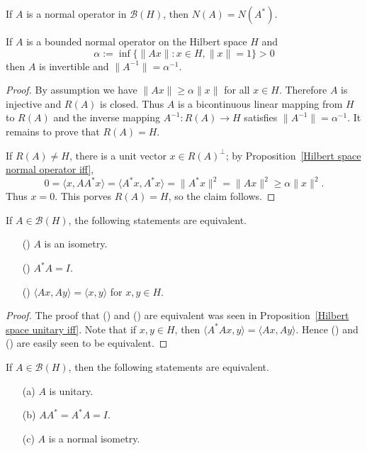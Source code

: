 \begin{corollary}
If $A$ is a normal operator in $\mathcal{B}(H)$, then $N(A)=N(A^*)$.
\end{corollary}
\begin{proposition}\label{Hilbert space normal operator invertible iff}
If $A$ is a bounded normal operator on the Hilbert space $H$ and
\[\alpha:=\inf\{\|Ax\|:x\in H,\|x\|=1\}>0\]
then $A$ is invertible and $\|A^{-1}\|=\alpha^{-1}$.
\end{proposition}
\begin{proof}
By assumption we have $\|Ax\|\geq\alpha\|x\|$ for all $x\in H$. Therefore  $A$ is injective and $R(A)$ is closed. Thus $A$ is a bicontinuous linear mapping from $H$ to $R(A)$ and the inverse mapping $A^{-1}:R(A)\to H$ satisfies $\|A^{-1}\|=\alpha^{-1}$. It remains to prove that $R(A)=H$.\par
If $R(A)\neq H$, there is a unit vector $x\in R(A)^\bot$; by Proposition~\ref{Hilbert space normal operator iff},
\[0=\langle x,AA^*x\rangle=\langle A^*x,A^*x\rangle=\|A^*x\|^2=\|Ax\|^2\geq\alpha\|x\|^2.\]
Thus $x=0$. This porves $R(A)=H$, so the claim follows.
\end{proof}
\begin{proposition}\label{Hilbert space isometry iff}
If $A\in\mathcal{B}(H)$, the following statements are equivalent.
\begin{itemize}
\item[(\rmnum{1})] $A$ is an isometry.
\item[(\rmnum{2})] $A^*A=I$.
\item[(\rmnum{3})] $\langle Ax,Ay\rangle=\langle x,y\rangle$ for $x,y\in H$.
\end{itemize}
\end{proposition}
\begin{proof}
The proof that () and () are equivalent was seen in Proposition~\ref{Hilbert space unitary iff}. Note that if $x,y\in H$, then $\langle A^*Ax,y\rangle=\langle Ax,Ay\rangle$. Hence () and () are easily seen to be equivalent.
\end{proof}
\begin{proposition}\label{Hilbert space unitary iff normal isometry}
If $A\in\mathcal{B}(H)$, then the following statements are equivalent.
\begin{itemize}
\item[(a)] $A$ is unitary.
\item[(b)] $AA^*=A^*A=I$.
\item[(c)] $A$ is a normal isometry.
\end{itemize}
\end{proposition}
